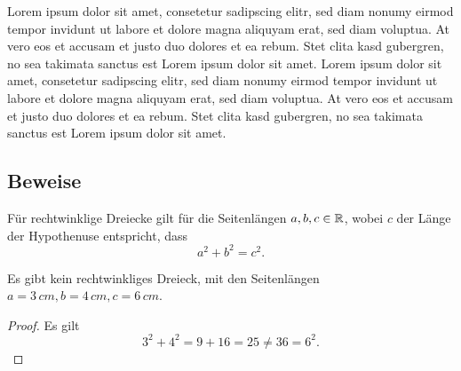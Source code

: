 
Lorem ipsum dolor sit amet, consetetur sadipscing elitr, sed diam nonumy eirmod tempor invidunt ut labore et dolore magna aliquyam erat, sed diam voluptua. At vero eos et accusam et justo duo dolores et ea rebum. Stet clita kasd gubergren, no sea takimata sanctus est Lorem ipsum dolor sit amet. Lorem ipsum dolor sit amet, consetetur sadipscing elitr, sed diam nonumy eirmod tempor invidunt ut labore et dolore magna aliquyam erat, sed diam voluptua. At vero eos et accusam et justo duo dolores et ea rebum. Stet clita kasd gubergren, no sea takimata sanctus est Lorem ipsum dolor sit amet.

\subsection{Beweise}

\begin{satz}
  Für rechtwinklige Dreiecke gilt für die Seitenlängen $a, b, c\in\mathbb{R}$, wobei $c$ der Länge der
  Hypothenuse entspricht, dass
  \begin{equation*}
    a^{2} + b^{2} = c^{2}.
  \end{equation*}
\end{satz}
\begin{kons}
  Es gibt kein rechtwinkliges Dreieck, mit den Seitenlängen $a=3\,cm, b=4\,cm, c=6\,cm$.
\end{kons}
\begin{proof}
  Es gilt
  \begin{equation*}
    3^{2} + 4^{2} = 9 + 16 = 25 \neq 36 = 6^{2}.
  \end{equation*}
\end{proof}

